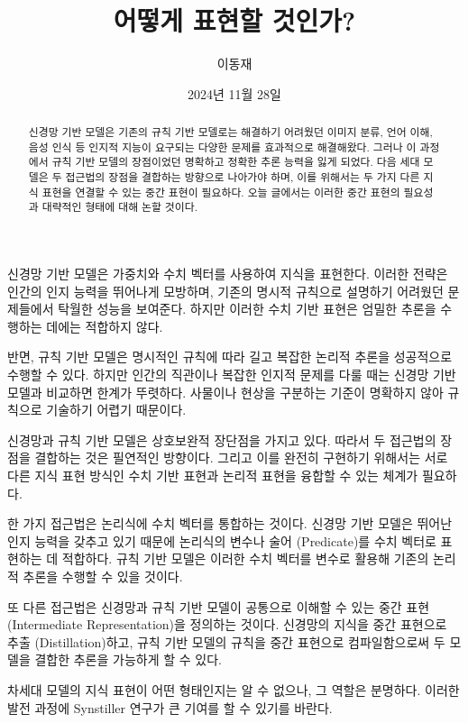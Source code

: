 \documentclass[11pt, oneside]{article}    %
\title{어떻게 표현할 것인가?}
\author{이동재}
\date{2024년 11월 28일}
\begin{document}
\maketitle

\begin{abstract}
신경망 기반 모델은 기존의 규칙 기반 모델로는 해결하기 어려웠던 이미지 분류, 언어 이해, 음성 인식 등 인지적 지능이 요구되는 다양한 문제를 효과적으로 해결해왔다. 그러나 이 과정에서 규칙 기반 모델의 장점이었던 명확하고 정확한 추론 능력을 잃게 되었다. 다음 세대 모델은 두 접근법의 장점을 결합하는 방향으로 나아가야 하며, 이를 위해서는 두 가지 다른 지식 표현을 연결할 수 있는 중간 표현이 필요하다. 오늘 글에서는 이러한 중간 표현의 필요성과 대략적인 형태에 대해 논할 것이다.
\end{abstract}

신경망 기반 모델은 가중치와 수치 벡터를 사용하여 지식을 표현한다. 이러한 전략은 인간의 인지 능력을 뛰어나게 모방하며, 기존의 명시적 규칙으로 설명하기 어려웠던 문제들에서 탁월한 성능을 보여준다. 하지만 이러한 수치 기반 표현은 엄밀한 추론을 수행하는 데에는 적합하지 않다.

반면, 규칙 기반 모델은 명시적인 규칙에 따라 길고 복잡한 논리적 추론을 성공적으로 수행할 수 있다. 하지만 인간의 직관이나 복잡한 인지적 문제를 다룰 때는 신경망 기반 모델과 비교하면 한계가 뚜렷하다. 사물이나 현상을 구분하는 기준이 명확하지 않아 규칙으로 기술하기 어렵기 때문이다.

신경망과 규칙 기반 모델은 상호보완적 장단점을 가지고 있다. 따라서 두 접근법의 장점을 결합하는 것은 필연적인 방향이다. 그리고 이를 완전히 구현하기 위해서는 서로 다른 지식 표현 방식인 수치 기반 표현과 논리적 표현을 융합할 수 있는 체계가 필요하다.

한 가지 접근법은 논리식에 수치 벡터를 통합하는 것이다. 신경망 기반 모델은 뛰어난 인지 능력을 갖추고 있기 때문에 논리식의 변수나 술어 (Predicate)를 수치 벡터로 표현하는 데 적합하다. 규칙 기반 모델은 이러한 수치 벡터를 변수로 활용해 기존의 논리적 추론을 수행할 수 있을 것이다.

또 다른 접근법은 신경망과 규칙 기반 모델이 공통으로 이해할 수 있는 중간 표현 (Intermediate Representation)을 정의하는 것이다. 신경망의 지식을 중간 표현으로 추출 (Distillation)하고, 규칙 기반 모델의 규칙을 중간 표현으로 컴파일함으로써 두 모델을 결합한 추론을 가능하게 할 수 있다.

차세대 모델의 지식 표현이 어떤 형태인지는 알 수 없으나, 그 역할은 분명하다. 이러한 발전 과정에 Synstiller 연구가 큰 기여를 할 수 있기를 바란다.
\end{document}

